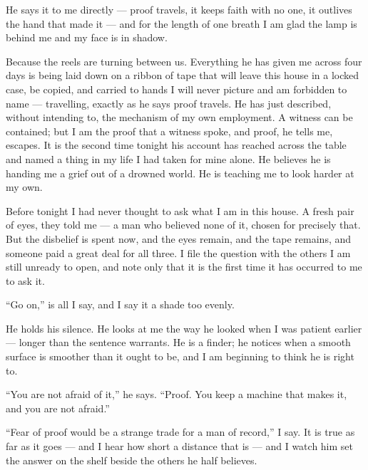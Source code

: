 \ornament

He says it to me directly --- proof travels, it keeps faith with no one, it outlives the hand that made it --- and for the length of one breath I am glad the lamp is behind me and my face is in shadow.\par

Because the reels are turning between us. Everything he has given me across four days is being laid down on a ribbon of tape that will leave this house in a locked case, be copied, and carried to hands I will never picture and am forbidden to name --- travelling, exactly as he says proof travels. He has just described, without intending to, the mechanism of my own employment. A witness can be contained; but I am the proof that a witness spoke, and proof, he tells me, escapes. It is the second time tonight his account has reached across the table and named a thing in my life I had taken for mine alone. He believes he is handing me a grief out of a drowned world. He is teaching me to look harder at my own.\par

Before tonight I had never thought to ask what I am in this house. A fresh pair of eyes, they told me --- a man who believed none of it, chosen for precisely that. But the disbelief is spent now, and the eyes remain, and the tape remains, and someone paid a great deal for all three. I file the question with the others I am still unready to open, and note only that it is the first time it has occurred to me to ask it.\par

``Go on,'' is all I say, and I say it a shade too evenly.\par

He holds his silence. He looks at me the way he looked when I was patient earlier --- longer than the sentence warrants. He is a finder; he notices when a smooth surface is smoother than it ought to be, and I am beginning to think he is right to.\par

``You are not afraid of it,'' he says. ``Proof. You keep a machine that makes it, and you are not afraid.''\par

``Fear of proof would be a strange trade for a man of record,'' I say. It is true as far as it goes --- and I hear how short a distance that is --- and I watch him set the answer on the shelf beside the others he half believes.\par

